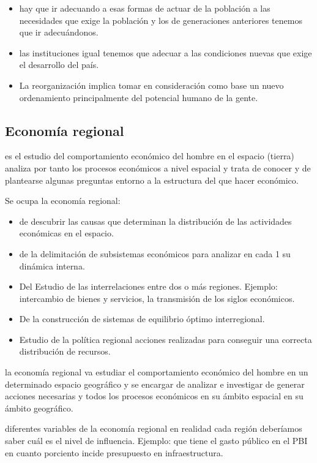 \documentclass[
  letterpaper,
  DIV=11,
  numbers=noendperiod]{scrartcl}
\providecommand{\tightlist}{%
  \setlength{\itemsep}{0pt}\setlength{\parskip}{0pt}}\usepackage{longtable,booktabs,array}
\begin{document}
\begin{itemize}
\tightlist
\item
  hay que ir adecuando a esas formas de actuar de la población a las
  necesidades que exige la población y los de generaciones anteriores
  tenemos que ir adecuándonos.
\item
  las instituciones igual tenemos que adecuar a las condiciones nuevas
  que exige el desarrollo del país.
\item
  La reorganización implica tomar en consideración como base un nuevo
  ordenamiento principalmente del potencial humano de la gente.
\end{itemize}

\hypertarget{economuxeda-regional}{%
\subsection{Economía regional}\label{economuxeda-regional}}

es el estudio del comportamiento económico del hombre en el espacio
(tierra) analiza por tanto los procesos económicos a nivel espacial y
trata de conocer y de plantearse algunas preguntas entorno a la
estructura del que hacer económico.

Se ocupa la economía regional:

\begin{itemize}
\tightlist
\item
  de descubrir las causas que determinan la distribución de las
  actividades económicas en el espacio.
\item
  de la delimitación de subsistemas económicos para analizar en cada 1
  su dinámica interna.
\item
  Del Estudio de las interrelaciones entre dos o más regiones. Ejemplo:
  intercambio de bienes y servicios, la transmisión de los siglos
  económicos.
\item
  De la construcción de sistemas de equilibrio óptimo interregional.
\item
  Estudio de la política regional acciones realizadas para conseguir una
  correcta distribución de recursos.
\end{itemize}

la economía regional va estudiar el comportamiento económico del hombre
en un determinado espacio geográfico y se encargar de analizar e
investigar de generar acciones necesarias y todos los procesos
económicos en su ámbito espacial en su ámbito geográfico.

diferentes variables de la economía regional en realidad cada región
deberíamos saber cuál es el nivel de influencia. Ejemplo: que tiene el
gasto público en el PBI en cuanto porciento incide presupuesto en
infraestructura.
\end{document}
